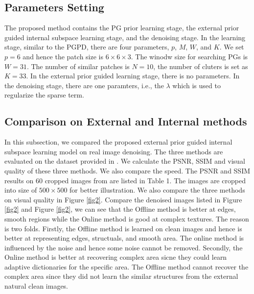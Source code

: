 \documentclass[10pt,twocolumn,letterpaper]{article}
\begin{document}
\subsection{Parameters Setting}
The proposed method contains the PG prior learning stage, the external prior guided internal subspace learning stage, and the denoising stage. In the learning stage, similar to the PGPD, there are four parameters, $p$, $M$, $W$, and $K$.  We set $p=6$ and hence the patch size is $6\times 6 \times 3$. The winodw size for searching PGs is $W = 31$. The number of similar patches is $N=10$, the number of cluters is set as $K = 33$. In the external prior guided learning stage, there is no parameters. In the denoising stage, there are one paramters, i.e., the $\lambda$ which is used to regularize the sparse term.


\subsection{Comparison on External and Internal methods}
In this subsection, we compared the proposed external prior guided internal subspace learning model on real image denoising. The three methods are evaluated on the dataset provided in \cite{crosschannel2016}. We calculate the PSNR, SSIM \cite{ssim} and visual quality of these three methods. We also compare the speed. The PSNR and SSIM results on 60 cropped images from \cite{crosschannel2016} are listed in Table 1. The images are cropped into size of $500\times 500$ for better illustration. We also compare the three methods on visual quality in Figure \ref{fig2}. Compare the denoised images listed in Figure \ref{fig2} and Figure \ref{fig2}, we can see that the Offline method is better at edges, smooth regions while the Online method is good at complex textures. The reason is two folds. Firstly, the Offline method is learned on clean images and hence is better at representing edges, structuals, and smooth area. The online method is influenced by the noise and hence some noise cannot be removed. Secondly, the Online method is better at recovering complex area sicne they could learn adaptive dictionaries for the specific area. The Offline method cannot recover the complex area since they did not learn the similar structures from the external natural clean images.
\end{document}
